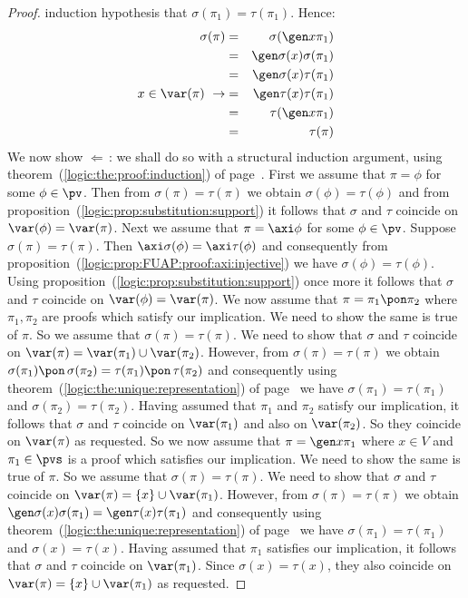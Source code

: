 \begin{proof}
induction hypothesis that $\sigma(\pi_{1})=\tau(\pi_{1})$. Hence:
    \begin{eqnarray*}
    \sigma(\pi)&=&\sigma(\gen x\pi_{1})\\
    &=&\gen\sigma(x)\sigma(\pi_{1})\\
    &=&\gen\sigma(x)\tau(\pi_{1})\\
    x\in\var(\pi)\ \rightarrow&=&\gen\tau(x)\tau(\pi_{1})\\
    &=&\tau(\gen x\pi_{1})\\
    &=&\tau(\pi)
    \end{eqnarray*}
We now show $\Leftarrow$\,: we shall do so with a structural
induction argument, using theorem~(\ref{logic:the:proof:induction})
of page~\pageref{logic:the:proof:induction}. First we assume that
$\pi=\phi$ for some $\phi\in\pv$. Then from $\sigma(\pi)=\tau(\pi)$
we obtain $\sigma(\phi)=\tau(\phi)$ and from
proposition~(\ref{logic:prop:substitution:support}) it follows that
$\sigma$ and $\tau$ coincide on $\var(\phi)=\var(\pi)$. Next we
assume that $\pi=\axi\phi$ for some $\phi\in\pv$. Suppose
$\sigma(\pi)=\tau(\pi)$. Then $\axi\sigma(\phi)=\axi\tau(\phi)$ and
consequently from
proposition~(\ref{logic:prop:FUAP:proof:axi:injective}) we have
$\sigma(\phi)=\tau(\phi)$. Using
proposition~(\ref{logic:prop:substitution:support}) once more it
follows that $\sigma$ and $\tau$ coincide on $\var(\phi)=\var(\pi)$.
We now assume that $\pi=\pi_{1}\pon\pi_{2}$ where $\pi_{1},\pi_{2}$
are proofs which satisfy our implication. We need to show the same
is true of $\pi$. So we assume that $\sigma(\pi)=\tau(\pi)$. We need
to show that $\sigma$ and $\tau$ coincide on
$\var(\pi)=\var(\pi_{1})\cup\var(\pi_{2})$. However, from
$\sigma(\pi)=\tau(\pi)$ we obtain
$\sigma(\pi_{1})\pon\,\sigma(\pi_{2})=\tau(\pi_{1})\pon\,\tau(\pi_{2})$
and consequently using
theorem~(\ref{logic:the:unique:representation}) of
page~\pageref{logic:the:unique:representation} we have
$\sigma(\pi_{1})=\tau(\pi_{1})$ and $\sigma(\pi_{2})=\tau(\pi_{2})$.
Having assumed that $\pi_{1}$ and $\pi_{2}$ satisfy our implication,
it follows that $\sigma$ and $\tau$ coincide on $\var(\pi_{1})$ and
also on $\var(\pi_{2})$. So they coincide on $\var(\pi)$ as
requested. So we now assume that $\pi=\gen x\pi_{1}$ where $x\in V$
and $\pi_{1}\in\pvs$ is a proof which satisfies our implication. We
need to show the same is true of $\pi$. So we assume that
$\sigma(\pi)=\tau(\pi)$. We need to show that $\sigma$ and $\tau$
coincide on $\var(\pi)=\{x\}\cup\var(\pi_{1})$. However, from
$\sigma(\pi)=\tau(\pi)$ we obtain
$\gen\sigma(x)\sigma(\pi_{1})=\gen\tau(x)\tau(\pi_{1})$ and
consequently using theorem~(\ref{logic:the:unique:representation})
of page~\pageref{logic:the:unique:representation} we have
$\sigma(\pi_{1})=\tau(\pi_{1})$ and $\sigma(x)=\tau(x)$. Having
assumed that $\pi_{1}$ satisfies our implication, it follows that
$\sigma$ and $\tau$ coincide on $\var(\pi_{1})$. Since
$\sigma(x)=\tau(x)$, they also coincide on
$\var(\pi)=\{x\}\cup\var(\pi_{1})$ as requested.
\end{proof}

